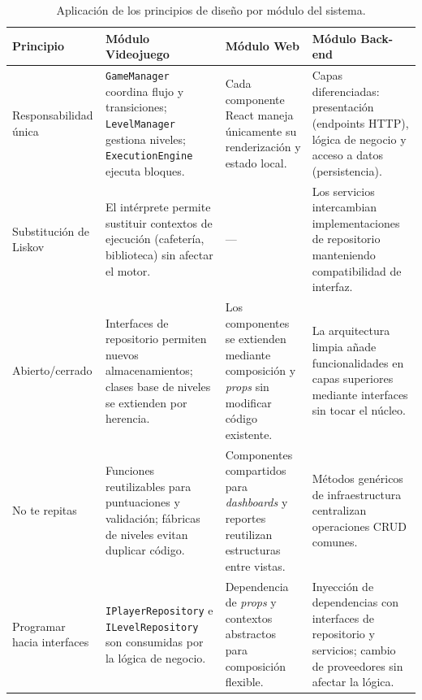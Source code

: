 \begin{table}[H]
	\centering
	\scriptsize
	\setlength{\tabcolsep}{3pt}
	\renewcommand{\arraystretch}{1.05}
	\caption{Aplicación de los principios de diseño por módulo del sistema.}
	\label{tab:principios}
	\begin{tabular}{@{}>{\raggedright\arraybackslash}p{3.0cm}>{\raggedright\arraybackslash}p{3.7cm}>{\raggedright\arraybackslash}p{3.7cm}>{\raggedright\arraybackslash}p{3.7cm}@{}}
		\toprule
		\textbf{Principio} & \textbf{Módulo Videojuego} & \textbf{Módulo Web} & \textbf{Módulo Back-end} \\
		\midrule
		Responsabilidad única & 
		\texttt{GameManager} coordina flujo y transiciones; \texttt{LevelManager} gestiona niveles; \texttt{ExecutionEngine} ejecuta bloques. & 
		Cada componente React maneja únicamente su renderización y estado local. & 
		Capas diferenciadas: presentación (endpoints HTTP), lógica de negocio y acceso a datos (persistencia). \\
		\midrule
		Substitución de Liskov & 
		El intérprete permite sustituir contextos de ejecución (cafetería, biblioteca) sin afectar el motor. & 
		--- & 
		Los servicios intercambian implementaciones de repositorio manteniendo compatibilidad de interfaz. \\
		\midrule
		Abierto/cerrado & 
		Interfaces de repositorio permiten nuevos almacenamientos; clases base de niveles se extienden por herencia. & 
		Los componentes se extienden mediante composición y \textit{props} sin modificar código existente. & 
		La arquitectura limpia añade funcionalidades en capas superiores mediante interfaces sin tocar el núcleo. \\
		\midrule
		No te repitas & 
		Funciones reutilizables para puntuaciones y validación; fábricas de niveles evitan duplicar código. & 
		Componentes compartidos para \textit{dashboards} y reportes reutilizan estructuras entre vistas. & 
		Métodos genéricos de infraestructura centralizan operaciones CRUD comunes. \\
		\midrule
		Programar hacia interfaces & 
		\texttt{IPlayerRepository} e \texttt{ILevelRepository} son consumidas por la lógica de negocio. & 
		Dependencia de \textit{props} y contextos abstractos para composición flexible. & 
		Inyección de dependencias con interfaces de repositorio y servicios; cambio de proveedores sin afectar la lógica. \\
		\bottomrule
	\end{tabular}
\end{table}


